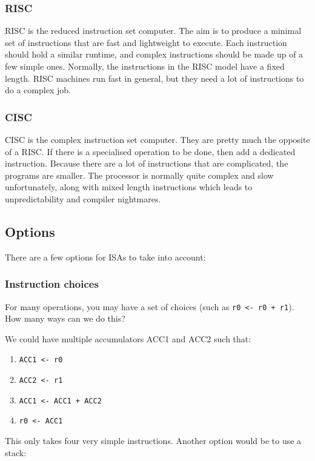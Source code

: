 \documentclass[11pt,a4paper,titlepage,dvipsnames,cmyk]{scrartcl}
\begin{document}
\subsubsection{RISC}%
\label{ssub:RISC}
RISC is the reduced instruction set computer. The aim is to produce a
minimal set of instructions that are fast and lightweight to execute. Each
instruction should hold a similar runtime, and complex instructions should
be made up of a few simple ones. Normally, the instructions in the RISC
model have a fixed length. RISC machines run fast in general, but they
need a lot of instructions to do a complex job.

\subsubsection{CISC}%
\label{ssub:CISC}
CISC is the complex instruction set computer. They are pretty much the
opposite of a RISC. If there is a specialised operation to be done, then
add a dedicated instruction. Because there are a lot of instructions that
are complicated, the programs are smaller. The processor is normally quite
complex and slow unfortunately, along with mixed length instructions which
leads to unpredictability and compiler nightmares. 

\subsection{Options}%
\label{sub:Options}

There are a few options for ISAs to take into account:

\subsubsection{Instruction choices}%
\label{ssub:instr-choices}
For many operations, you may have a set of choices (such as \lstinline|r0 <- r0 + r1|). How many ways can we do this?

We could have multiple accumulators ACC1 and ACC2 such that:

\begin{enumerate}
    \item \lstinline|ACC1 <- r0|
    \item \lstinline|ACC2 <- r1|
    \item \lstinline|ACC1 <- ACC1 + ACC2|
    \item \lstinline|r0 <- ACC1| 
\end{enumerate}

This only takes four very simple instructions. Another option would be to
use a stack:
\end{document}
